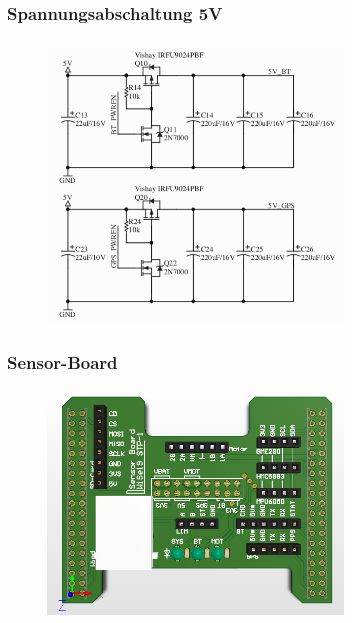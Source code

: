 \documentclass{beamer}
\begin{document}
\begin{frame}
	\frametitle{Spannungsabschaltung 5V}
	 \begin{figure}[H]
    		\centering
   		 \includegraphics[width=0.7\textwidth]{./img/spannungsabschaltung.png}
 	 \end{figure}

\end{frame}


\begin{frame}
	\frametitle{Sensor-Board}
	 \begin{figure}[H]
    		\centering
    		\includegraphics[width=0.7\textwidth]{./img/PCB_Sensors_3D_top.PNG}
  	 \end{figure}
\end{frame}
\end{document}
